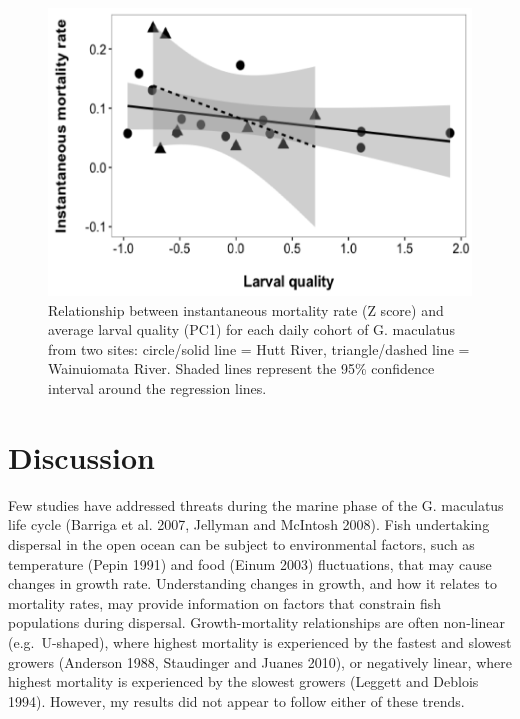 \documentclass[]{book}
\begin{document}
\begin{figure}
\centering
\includegraphics{images/data-chapter-2/mortality-rates.png}
\caption{\label{fig:mortality-rates}Relationship between instantaneous
mortality rate (Z score) and average larval quality (PC1) for each daily
cohort of G. maculatus from two sites: circle/solid line = Hutt River,
triangle/dashed line = Wainuiomata River. Shaded lines represent the
95\% confidence interval around the regression lines.}
\end{figure}

\section{Discussion}\label{discussion-1}

Few studies have addressed threats during the marine phase of the G.
maculatus life cycle (Barriga et al. 2007, Jellyman and McIntosh 2008).
Fish undertaking dispersal in the open ocean can be subject to
environmental factors, such as temperature (Pepin 1991) and food (Einum
2003) fluctuations, that may cause changes in growth rate. Understanding
changes in growth, and how it relates to mortality rates, may provide
information on factors that constrain fish populations during dispersal.
Growth-mortality relationships are often non-linear (e.g.~U-shaped),
where highest mortality is experienced by the fastest and slowest
growers (Anderson 1988, Staudinger and Juanes 2010), or negatively
linear, where highest mortality is experienced by the slowest growers
(Leggett and Deblois 1994). However, my results did not appear to follow
either of these trends.
\end{document}
